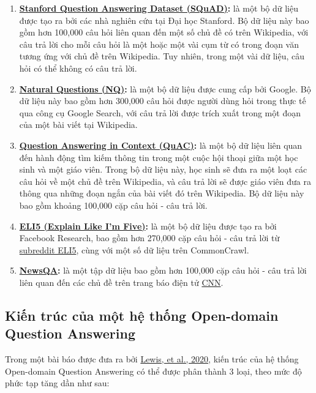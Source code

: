 \begin{enumerate}
    \item \textbf{\href{https://rajpurkar.github.io/SQuAD-explorer/}{Stanford Question Answering Dataset (SQuAD)}:} là một bộ dữ liệu được tạo ra bởi các nhà nghiên cứu tại Đại học Stanford. Bộ dữ liệu này bao gồm hơn 100,000 câu hỏi liên quan đến một số chủ đề có trên Wikipedia, với câu trả lời cho mỗi câu hỏi là một hoặc một vài cụm từ có trong đoạn văn tương ứng với chủ đề trên Wikipedia. Tuy nhiên, trong một vài dữ liệu, câu hỏi có thể không có câu trả lời.
    
    \item \textbf{\href{https://ai.google.com/research/NaturalQuestions}{Natural Questions (NQ)}:} là một bộ dữ liệu được cung cấp bởi Google. Bộ dữ liệu này bao gồm hơn 300,000 câu hỏi được người dùng hỏi trong thực tế qua công cụ Google Search, với câu trả lời được trích xuất trong một đoạn của một bài viết tại Wikipedia.
    
    \item \textbf{\href{https://quac.ai/}{Question Answering in Context (QuAC)}:} là một bộ dữ liệu liên quan đến hành động tìm kiếm thông tin trong một cuộc hội thoại giữa một học sinh và một giáo viên. Trong bộ dữ liệu này, học sinh sẽ đưa ra một loạt các câu hỏi về một chủ đề trên Wikipedia, và câu trả lời sẽ được giáo viên đưa ra thông qua những đoạn ngắn của bài viết đó trên Wikipedia. Bộ dữ liệu này bao gồm khoảng 100,000 cặp câu hỏi - câu trả lời.
    
    \item \textbf{\href{https://github.com/facebookresearch/ELI5}{ELI5 (Explain Like I’m Five)}:} là một bộ dữ liệu được tạo ra bởi Facebook Research, bao gồm hơn 270,000 cặp câu hỏi - câu trả lời từ \href{https://www.reddit.com/r/explainlikeimfive/}{subreddit ELI5}, cùng với một số dữ liệu trên CommonCrawl.
    
    \item \textbf{\href{https://arxiv.org/pdf/1611.09830.pdf}{NewsQA}:} là một tập dữ liệu bao gồm hơn 100,000 cặp câu hỏi - câu trả lời liên quan đến các chủ đề trên trang báo điện tử \href{https://www.cnn.com}{CNN}.
\end{enumerate}

\subsection{Kiến trúc của một hệ thống Open-domain Question Answering}
Trong một bài báo được đưa ra bởi \href{https://arxiv.org/abs/2008.02637}{Lewis, et al., 2020}, kiến trúc của hệ thống Open-domain Question Answering có thể được phân thành 3 loại, theo mức độ phức tạp tăng dần như sau:

